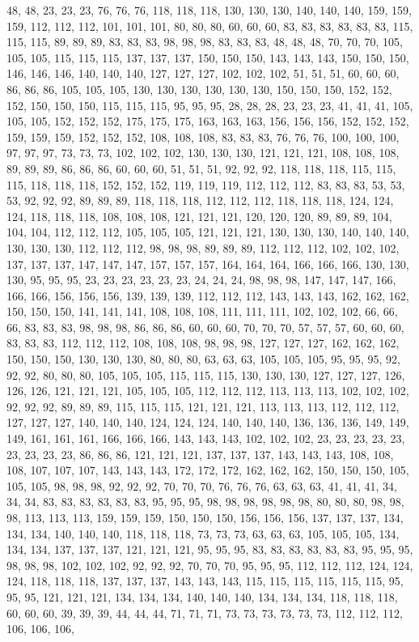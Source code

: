 48, 48, 23, 23, 23, 76, 76, 76, 118, 118, 118, 130, 130, 130, 140, 140, 140, 159, 159, 159, 112, 112, 112, 101, 101, 101, 80, 80, 80, 60, 60, 60, 83, 83, 83, 83, 83, 83, 115, 115, 115, 89, 89, 89, 83, 83, 83, 98, 98, 98, 83, 83, 83, 48, 48, 48, 70, 70, 70, 105, 105, 105, 115, 115, 115, 137, 137, 137, 150, 150, 150, 143, 143, 143, 150, 150, 150, 146, 146, 146, 140, 140, 140, 127, 127, 127, 102, 102, 102, 51, 51, 51, 60, 60, 60, 86, 86, 86, 105, 105, 105, 130, 130, 130, 130, 130, 130, 150, 150, 150, 152, 152, 152, 150, 150, 150, 115, 115, 115, 95, 95, 95, 28, 28, 28, 23, 23, 23, 41, 41, 41, 105, 105, 105, 152, 152, 152, 175, 175, 175, 163, 163, 163, 156, 156, 156, 152, 152, 152, 159, 159, 159, 152, 152, 152, 108, 108, 108, 83, 83, 83, 76, 76, 76, 100, 100, 100, 97, 97, 97, 73, 73, 73, 102, 102, 102, 130, 130, 130, 121, 121, 121, 108, 108, 108, 89, 89, 89, 86, 86, 86, 60, 60, 60, 51, 51, 51, 92, 92, 92, 118, 118, 118, 115, 115, 115, 118, 118, 118, 152, 152, 152, 119, 119, 119, 112, 112, 112, 83, 83, 83, 53, 53, 53, 92, 92, 92, 89, 89, 89, 118, 118, 118, 112, 112, 112, 118, 118, 118, 124, 124, 124, 118, 118, 118, 108, 108, 108, 121, 121, 121, 120, 120, 120, 89, 89, 89, 104, 104, 104, 112, 112, 112, 105, 105, 105, 121, 121, 121, 130, 130, 130, 140, 140, 140, 130, 130, 130, 112, 112, 112, 98, 98, 98, 89, 89, 89, 112, 112, 112, 102, 102, 102, 137, 137, 137, 147, 147, 147, 157, 157, 157, 164, 164, 164, 166, 166, 166, 130, 130, 130, 95, 95, 95, 23, 23, 23, 23, 23, 23, 24, 24, 24, 98, 98, 98, 147, 147, 147, 166, 166, 166, 156, 156, 156, 139, 139, 139, 112, 112, 112, 143, 143, 143, 162, 162, 162, 150, 150, 150, 141, 141, 141, 108, 108, 108, 111, 111, 111, 102, 102, 102, 66, 66, 66, 83, 83, 83, 98, 98, 98, 86, 86, 86, 60, 60, 60, 70, 70, 70, 57, 57, 57, 60, 60, 60, 83, 83, 83, 112, 112, 112, 108, 108, 108, 98, 98, 98, 127, 127, 127, 162, 162, 162, 150, 150, 150, 130, 130, 130, 80, 80, 80, 63, 63, 63, 105, 105, 105, 95, 95, 95, 92, 92, 92, 80, 80, 80, 105, 105, 105, 115, 115, 115, 130, 130, 130, 127, 127, 127, 126, 126, 126, 121, 121, 121, 105, 105, 105, 112, 112, 112, 113, 113, 113, 102, 102, 102, 92, 92, 92, 89, 89, 89, 115, 115, 115, 121, 121, 121, 113, 113, 113, 112, 112, 112, 127, 127, 127, 140, 140, 140, 124, 124, 124, 140, 140, 140, 136, 136, 136, 149, 149, 149, 161, 161, 161, 166, 166, 166, 143, 143, 143, 102, 102, 102, 23, 23, 23, 23, 23, 23, 23, 23, 23, 86, 86, 86, 121, 121, 121, 137, 137, 137, 143, 143, 143, 108, 108, 108, 107, 107, 107, 143, 143, 143, 172, 172, 172, 162, 162, 162, 150, 150, 150, 105, 105, 105, 98, 98, 98, 92, 92, 92, 70, 70, 70, 76, 76, 76, 63, 63, 63, 41, 41, 41, 34, 34, 34, 83, 83, 83, 83, 83, 83, 95, 95, 95, 98, 98, 98, 98, 98, 98, 80, 80, 80, 98, 98, 98, 113, 113, 113, 159, 159, 159, 150, 150, 150, 156, 156, 156, 137, 137, 137, 134, 134, 134, 140, 140, 140, 118, 118, 118, 73, 73, 73, 63, 63, 63, 105, 105, 105, 134, 134, 134, 137, 137, 137, 121, 121, 121, 95, 95, 95, 83, 83, 83, 83, 83, 83, 95, 95, 95, 98, 98, 98, 102, 102, 102, 92, 92, 92, 70, 70, 70, 95, 95, 95, 112, 112, 112, 124, 124, 124, 118, 118, 118, 137, 137, 137, 143, 143, 143, 115, 115, 115, 115, 115, 115, 95, 95, 95, 121, 121, 121, 134, 134, 134, 140, 140, 140, 134, 134, 134, 118, 118, 118, 60, 60, 60, 39, 39, 39, 44, 44, 44, 71, 71, 71, 73, 73, 73, 73, 73, 73, 112, 112, 112, 106, 106, 106, 